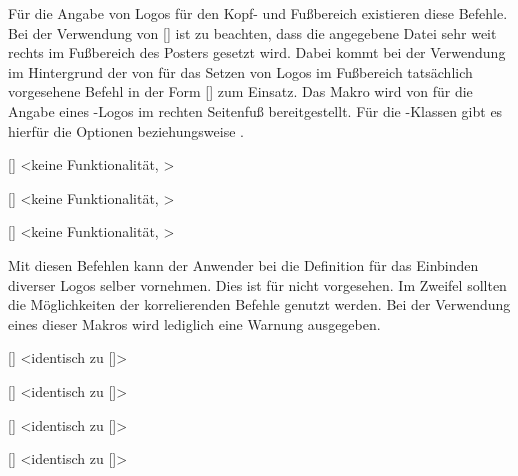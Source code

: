 \begin{DeclareEntity}{}
\begin{Declaration}
\begin{Declaration}
\begin{Declaration}
Für die Angabe von Logos für den Kopf- und Fußbereich existieren diese Befehle. 
Bei der Verwendung von [] ist zu 
beachten, dass die angegebene Datei sehr weit rechts im Fußbereich des Posters 
gesetzt wird. Dabei kommt bei der Verwendung im Hintergrund der von \TUDScript 
für das Setzen von Logos im Fußbereich tatsächlich vorgesehene Befehl in der 
Form []
zum Einsatz. Das Makro  wird von  für 
die Angabe eines \DDC-Logos im rechten Seitenfuß bereitgestellt. Für die 
\TUDScript-Klassen gibt es hierfür die Optionen  beziehungsweise 
.
\end{Declaration}
\end{Declaration}
\end{Declaration}

\begin{Declaration}
  {[]}
  <keine Funktionalität, >
\begin{Declaration}
  {[]}
  <keine Funktionalität, >
\begin{Declaration}
  {[]}
  <keine Funktionalität, >
\printdeclarationlist

Mit diesen Befehlen kann der Anwender bei  die Definition 
für das Einbinden diverser Logos selber vornehmen. Dies ist für \TUDScript 
nicht vorgesehen. Im Zweifel sollten die Möglichkeiten der korrelierenden 
Befehle genutzt werden. Bei der Verwendung eines dieser Makros wird lediglich 
eine Warnung ausgegeben.
\end{Declaration}
\end{Declaration}
\end{Declaration}

\begin{Declaration}
  {[]}
  <identisch zu []>
\begin{Declaration}
  {[]}
  <identisch zu []>
\begin{Declaration}
  {[]}
  <identisch zu [\OPValue{*}]>
\begin{Declaration}
  {[]}
  <identisch zu [\MPValue{*}]>
\printdeclarationlist


\end{Declaration}
\end{Declaration}
\end{Declaration}
\end{Declaration}
\end{DeclareEntity}
